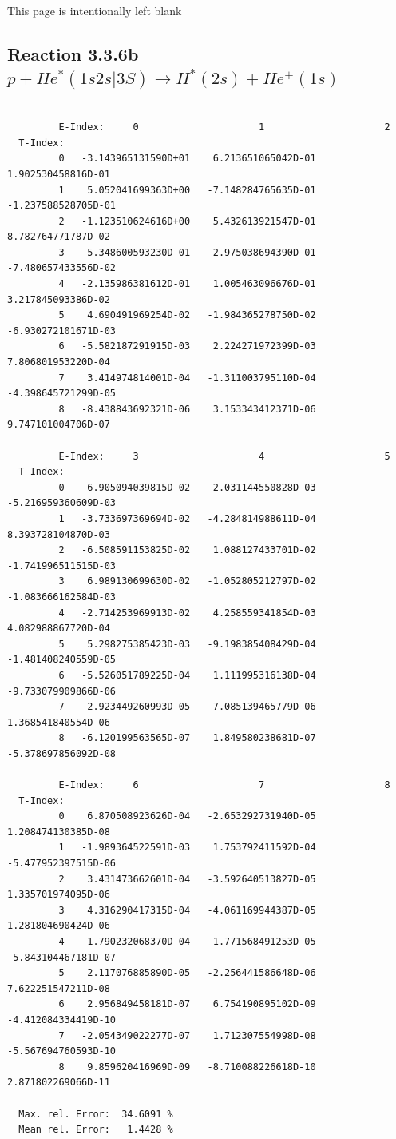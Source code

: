 \documentclass[12pt,dvips]{article}
\begin{document}
\newpage
This page is intentionally left blank
\newpage

\subsection{
Reaction 3.3.6b   $p + He^*(1s2s|3S) \rightarrow H^*(2s) + He^+(1s) $
}

\begin{small}\begin{verbatim}

         E-Index:     0                     1                     2
  T-Index:
         0   -3.143965131590D+01    6.213651065042D-01    1.902530458816D-01
         1    5.052041699363D+00   -7.148284765635D-01   -1.237588528705D-01
         2   -1.123510624616D+00    5.432613921547D-01    8.782764771787D-02
         3    5.348600593230D-01   -2.975038694390D-01   -7.480657433556D-02
         4   -2.135986381612D-01    1.005463096676D-01    3.217845093386D-02
         5    4.690491969254D-02   -1.984365278750D-02   -6.930272101671D-03
         6   -5.582187291915D-03    2.224271972399D-03    7.806801953220D-04
         7    3.414974814001D-04   -1.311003795110D-04   -4.398645721299D-05
         8   -8.438843692321D-06    3.153343412371D-06    9.747101004706D-07

         E-Index:     3                     4                     5
  T-Index:
         0    6.905094039815D-02    2.031144550828D-03   -5.216959360609D-03
         1   -3.733697369694D-02   -4.284814988611D-04    8.393728104870D-03
         2   -6.508591153825D-02    1.088127433701D-02   -1.741996511515D-03
         3    6.989130699630D-02   -1.052805212797D-02   -1.083666162584D-03
         4   -2.714253969913D-02    4.258559341854D-03    4.082988867720D-04
         5    5.298275385423D-03   -9.198385408429D-04   -1.481408240559D-05
         6   -5.526051789225D-04    1.111995316138D-04   -9.733079909866D-06
         7    2.923449260993D-05   -7.085139465779D-06    1.368541840554D-06
         8   -6.120199563565D-07    1.849580238681D-07   -5.378697856092D-08

         E-Index:     6                     7                     8
  T-Index:
         0    6.870508923626D-04   -2.653292731940D-05    1.208474130385D-08
         1   -1.989364522591D-03    1.753792411592D-04   -5.477952397515D-06
         2    3.431473662601D-04   -3.592640513827D-05    1.335701974095D-06
         3    4.316290417315D-04   -4.061169944387D-05    1.281804690424D-06
         4   -1.790232068370D-04    1.771568491253D-05   -5.843104467181D-07
         5    2.117076885890D-05   -2.256441586648D-06    7.622251547211D-08
         6    2.956849458181D-07    6.754190895102D-09   -4.412084334419D-10
         7   -2.054349022277D-07    1.712307554998D-08   -5.567694760593D-10
         8    9.859620416969D-09   -8.710088226618D-10    2.871802269066D-11

  Max. rel. Error:  34.6091 %
  Mean rel. Error:   1.4428 %
\end{verbatim}\end{small}
\end{document}
